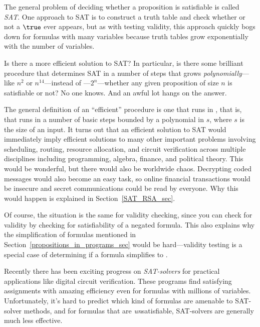 The general problem of deciding whether a proposition is
satisfiable is called
\emph{SAT}.  One approach to SAT is to construct a truth table 
and check whether or not a $\true$ ever
appears, but as with testing validity, this approach quickly bogs down
for formulas with many variables because truth tables grow
exponentially with the number of variables.

Is there a more efficient solution to SAT?  In particular, is
there some brilliant procedure that determines SAT in a number of steps
that grows \emph{polynomially}---like
$n^2$ or $n^{14}$---instead of \emph{}---$2^n$---whether any given proposition of size
$n$ is satisfiable or not?  No one knows.  And an awful lot hangs on
the answer.

The general definition of an ``efficient'' procedure is one that runs
in , that is, that runs in a number of basic
steps bounded by a polynomial in $s$, where $s$ is the size of an
input.  It turns out that an efficient solution to SAT would
immediately imply efficient solutions to many other important problems
involving scheduling, routing, resource allocation, and circuit
verification across multiple disciplines including programming,
algebra, finance, and political theory.  This would
be wonderful, but there would also be worldwide chaos.  Decrypting
coded messages would also become an easy task, so online financial
transactions would be insecure and secret communications could be read
by everyone.  Why this would happen is explained in
Section~\ref{SAT_RSA_sec}.

Of course, the situation is the same for validity
checking, since you can check for validity by checking
 for satisfiability of a negated
formula.  This also explains why the simplification of formulas
mentioned in Section~\ref{propositions_in_programs_sec} would be
hard---validity testing is a special case of determining if a formula
simplifies to \true.

Recently there has been exciting progress on \emph{SAT-solvers}
 for practical applications like
digital circuit verification.  These programs find satisfying
assignments with amazing efficiency even for formulas with millions of
variables.  Unfortunately, it's hard to predict which kind of formulas
are amenable to SAT-solver methods, and for formulas that are
\emph{un}satisfiable, SAT-solvers are generally much less effective.

